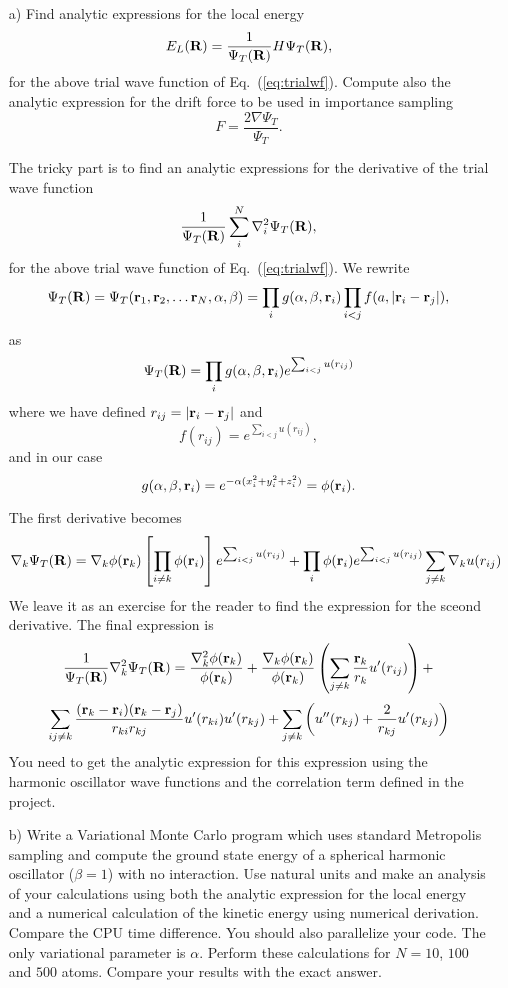 \documentclass[10pt]{article}
\begin{document}
 \begin{enumerate}
 \item[a)] Find analytic expressions for the local energy 
 \begin{equation}
    E_L({\bf R})=\frac{1}{\Psi_T({\bf R})}H\Psi_T({\bf R}),
    \label{eq:locale}
 \end{equation}
 for the above 
 trial wave function of Eq.~(\ref{eq:trialwf}).
 Compute also the analytic expression for the drift force to be used in importance sampling
 \begin{equation}
   F = \frac{2\nabla \Psi_T}{\Psi_T}.
 \end{equation}

The tricky part is to find an analytic expressions for the derivative of the trial wave function 
\[
   \frac{1}{\Psi_T({\bf R})}\sum_i^{N}\nabla_i^2\Psi_T({\bf R}),
\]
for the above 
trial wave function of Eq.~(\ref{eq:trialwf}).
We rewrite 
\[
\Psi_T({\bf R})=\Psi_T({\bf r}_1, {\bf r}_2, \dots {\bf r}_N,\alpha,\beta)=\prod_i g(\alpha,\beta,{\bf r}_i)\prod_{i<j}f(a,|{\bf r}_i-{\bf r}_j|),
\]
as
\[
\Psi_T({\bf R})=\prod_i g(\alpha,\beta,{\bf r}_i)e^{\sum_{i<j}u(r_{ij})}
\]
where we have defined $r_{ij}=|{\bf r}_i-{\bf r}_j|$
and 
\[
   f(r_{ij})= e^{\sum_{i<j}u(r_{ij})},
\]
and in our case 
\[
    g(\alpha,\beta,{\bf r}_i) = e^{-\alpha(x_i^2+y_i^2+z_i^2)}= \phi({\bf r}_i).
\]

The first derivative becomes
\[
  \nabla_k\Psi_T({\bf R}) = \nabla_k\phi({\bf r}_k)\left[\prod_{i\ne k}\phi({\bf r}_i)\right]e^{\sum_{i<j}u(r_{ij})}+ 
\prod_i\phi({\bf r}_i)e^{\sum_{i<j}u(r_{ij})}\sum_{j\ne k}\nabla_k u(r_{ij})
\]
We leave it as an exercise for the reader to find the expression for the sceond derivative.
The final expression is
\[
   \frac{1}{\Psi_T({\bf R})}\nabla_k^2\Psi_T({\bf R})=
   \frac{\nabla_k^2\phi({\bf r}_k)}{\phi({\bf r}_k)}+
\frac{\nabla_k\phi({\bf r}_k)}{\phi({\bf r}_k)}\left(\sum_{j\ne k}\frac{{\bf r}_k}{r_k}u'(r_{ij})\right)+
\] 
\[
\sum_{ij\ne k}\frac{({\bf r}_k-{\bf r}_i)({\bf r}_k-{\bf r}_j)}{r_{ki}r_{kj}}u'(r_{ki})u'(r_{kj})+
\sum_{j\ne k}\left( u''(r_{kj})+\frac{2}{r_{kj}}u'(r_{kj})\right)
\]
You need to get the analytic expression for this expression using the harmonic oscillator wave functions
and the correlation term defined in the project.



 \item[b)] Write a Variational Monte Carlo program which uses standard Metropolis sampling 
 and compute the ground state energy 
 of a spherical harmonic oscillator ($\beta = 1$) with no interaction.     
 Use natural units and make an analysis of your calculations using both the analytic expression for the 
 local energy and a numerical calculation of the kinetic energy using numerical derivation.
 Compare the CPU time difference.  You should also  parallelize your code.
 The only variational parameter is $\alpha$. Perform these calculations for $N=10$, 
 $100$ and $500$ atoms. Compare your results with the exact answer. 


\end{enumerate}
\end{document}
